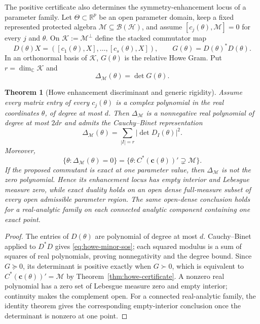 \documentclass[11pt]{article}
\newtheorem{theorem}{Theorem}[section]
\theoremstyle{definition}
\theoremstyle{remark}
\newcommand{\R}{\mathbb R}
\newcommand{\C}{\mathbb C}
\newcommand{\Hh}{\mathcal H}
\newcommand{\M}{\mathcal M}
\newcommand{\Kk}{\mathcal K}
\begin{document}
The positive certificate also determines the symmetry-enhancement locus of a
parameter family.  Let $\Theta\subset\R^p$ be an open parameter domain, keep a
fixed represented protected algebra $\M\subseteq\mathcal B(\Hh)$, and assume
$[c_j(\theta),\M]=0$ for every $j$ and $\theta$.  On
$\Kk:=\M^\perp$ define the stacked commutator map
\[
 D(\theta)X=([c_1(\theta),X],\ldots,[c_s(\theta),X]),
 \qquad G(\theta)=D(\theta)^*D(\theta).
\]
In an orthonormal basis of $\Kk$, $G(\theta)$ is the relative Howe Gram.
Put $r=\dim_\C\Kk$ and
\begin{equation}
 \Delta_{\M}(\theta)=\det G(\theta).
 \label{eq:howe-discriminant}
\end{equation}

\begin{theorem}[Howe enhancement discriminant and generic rigidity]
\label{thm:howe-discriminant}
Assume every matrix entry of every $c_j(\theta)$ is a complex polynomial in
the real coordinates $\theta$, of degree at most $d$.  Then
$\Delta_{\M}$ is a nonnegative real polynomial of degree at most $2dr$ and
admits the Cauchy--Binet representation
\begin{equation}
 \boxed{
 \Delta_{\M}(\theta)
 =\sum_{|I|=r}|\det D_I(\theta)|^2.}
 \label{eq:howe-minor-sos}
\end{equation}
Moreover,
\begin{equation}
 \boxed{
 \{\theta:\Delta_{\M}(\theta)=0\}
 =\{\theta:C^*(\bm c(\theta))'\supsetneq\M\}.}
 \label{eq:howe-enhancement-locus}
\end{equation}
If the proposed commutant is exact at one parameter value, then
$\Delta_{\M}$ is not the zero polynomial.  Hence its enhancement locus has
empty interior and Lebesgue measure zero, while exact duality holds on an open
dense full-measure subset of every open admissible parameter region.  The same
open-dense conclusion holds for a real-analytic family on each connected
analytic component containing one exact point.
\end{theorem}

\begin{proof}
The entries of $D(\theta)$ are polynomial of degree at most $d$.
Cauchy--Binet applied to $D^*D$ gives
\eqref{eq:howe-minor-sos}; each squared modulus is a sum of squares of real
polynomials, proving nonnegativity and the degree bound.  Since $G\succeq0$,
its determinant is positive exactly when $G\succ0$, which is equivalent to
$C^*(\bm c(\theta))'=\M$ by Theorem~\ref{thm:howe-certificate}.  A nonzero
real polynomial has a zero set of Lebesgue measure zero and empty interior;
continuity makes the complement open.  For a connected real-analytic family,
the identity theorem gives the corresponding empty-interior conclusion once
the determinant is nonzero at one point.
\end{proof}
\end{document}
